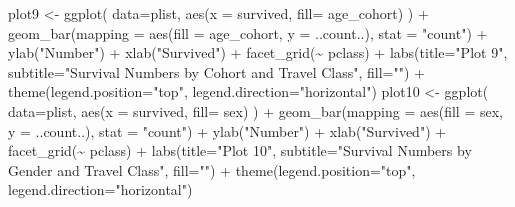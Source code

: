 \documentclass[
]{article}
\newenvironment{Shaded}{\begin{snugshade}}{\end{snugshade}}
\newcommand{\AttributeTok}[1]{\textcolor[rgb]{0.77,0.63,0.00}{#1}}
\newcommand{\FunctionTok}[1]{\textcolor[rgb]{0.00,0.00,0.00}{#1}}
\newcommand{\NormalTok}[1]{#1}
\newcommand{\OtherTok}[1]{\textcolor[rgb]{0.56,0.35,0.01}{#1}}
\newcommand{\SpecialCharTok}[1]{\textcolor[rgb]{0.00,0.00,0.00}{#1}}
\newcommand{\StringTok}[1]{\textcolor[rgb]{0.31,0.60,0.02}{#1}}
\begin{document}
\begin{Shaded}
\begin{Highlighting}[]
\NormalTok{plot9 }\OtherTok{\textless{}{-}} \FunctionTok{ggplot}\NormalTok{( }\AttributeTok{data=}\NormalTok{plist, }\FunctionTok{aes}\NormalTok{(}\AttributeTok{x =}\NormalTok{ survived, }\AttributeTok{fill=}\NormalTok{ age\_cohort) ) }\SpecialCharTok{+} \FunctionTok{geom\_bar}\NormalTok{(}\AttributeTok{mapping =} \FunctionTok{aes}\NormalTok{(}\AttributeTok{fill =}\NormalTok{ age\_cohort, }\AttributeTok{y =}\NormalTok{ ..count..), }\AttributeTok{stat =} \StringTok{"count"}\NormalTok{) }\SpecialCharTok{+} \FunctionTok{ylab}\NormalTok{(}\StringTok{"Number"}\NormalTok{) }\SpecialCharTok{+} \FunctionTok{xlab}\NormalTok{(}\StringTok{"Survived"}\NormalTok{) }\SpecialCharTok{+} \FunctionTok{facet\_grid}\NormalTok{(}\SpecialCharTok{\textasciitilde{}}\NormalTok{ pclass) }\SpecialCharTok{+} \FunctionTok{labs}\NormalTok{(}\AttributeTok{title=}\StringTok{"Plot 9"}\NormalTok{, }\AttributeTok{subtitle=}\StringTok{"Survival Numbers by Cohort and Travel Class"}\NormalTok{, }\AttributeTok{fill=}\StringTok{""}\NormalTok{) }\SpecialCharTok{+} \FunctionTok{theme}\NormalTok{(}\AttributeTok{legend.position=}\StringTok{"top"}\NormalTok{, }\AttributeTok{legend.direction=}\StringTok{"horizontal"}\NormalTok{)}
\NormalTok{plot10 }\OtherTok{\textless{}{-}} \FunctionTok{ggplot}\NormalTok{( }\AttributeTok{data=}\NormalTok{plist, }\FunctionTok{aes}\NormalTok{(}\AttributeTok{x =}\NormalTok{ survived, }\AttributeTok{fill=}\NormalTok{ sex) ) }\SpecialCharTok{+} \FunctionTok{geom\_bar}\NormalTok{(}\AttributeTok{mapping =} \FunctionTok{aes}\NormalTok{(}\AttributeTok{fill =}\NormalTok{ sex, }\AttributeTok{y =}\NormalTok{ ..count..), }\AttributeTok{stat =} \StringTok{"count"}\NormalTok{) }\SpecialCharTok{+} \FunctionTok{ylab}\NormalTok{(}\StringTok{"Number"}\NormalTok{) }\SpecialCharTok{+} \FunctionTok{xlab}\NormalTok{(}\StringTok{"Survived"}\NormalTok{) }\SpecialCharTok{+} \FunctionTok{facet\_grid}\NormalTok{(}\SpecialCharTok{\textasciitilde{}}\NormalTok{ pclass) }\SpecialCharTok{+} \FunctionTok{labs}\NormalTok{(}\AttributeTok{title=}\StringTok{"Plot 10"}\NormalTok{, }\AttributeTok{subtitle=}\StringTok{"Survival Numbers by Gender and Travel Class"}\NormalTok{, }\AttributeTok{fill=}\StringTok{""}\NormalTok{) }\SpecialCharTok{+} \FunctionTok{theme}\NormalTok{(}\AttributeTok{legend.position=}\StringTok{"top"}\NormalTok{, }\AttributeTok{legend.direction=}\StringTok{"horizontal"}\NormalTok{)}

\end{Highlighting}
\end{Shaded}
\end{document}
